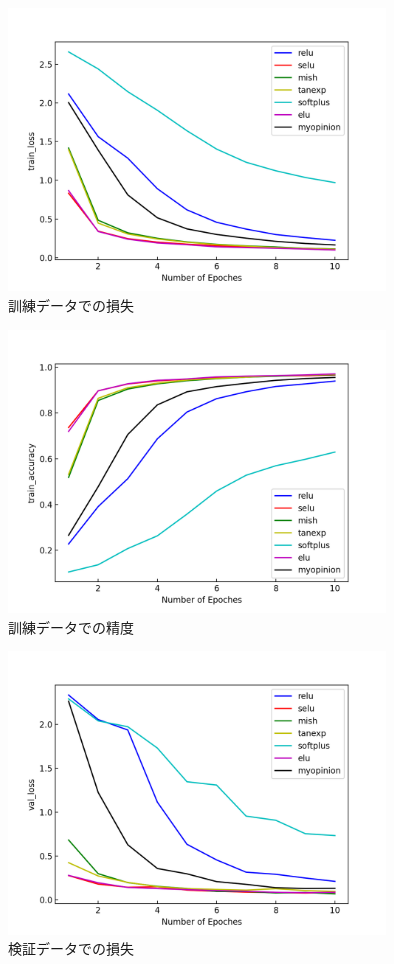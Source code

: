 \documentclass[12pt,a4j,draft]{jsarticle}
\begin{document}
\begin{figure}[H]
  \begin{center}
    \includegraphics[width=10.0cm]{../comparison_data/mnist_train_loss.png}
    \caption{訓練データでの損失}
    \label{train_loss}
  \end{center}
\end{figure}
\begin{figure}[H]
  \begin{center}
    \includegraphics[width=10.0cm]{../comparison_data/mnist_train_acc.png}
    \caption{訓練データでの精度}
    \label{train_acc}
  \end{center}
\end{figure}
\begin{figure}[H]
  \begin{center}
    \includegraphics[width=10.0cm]{../comparison_data/mnist_val_loss.png}
    \caption{検証データでの損失}
    \label{val_loss}
  \end{center}
\end{figure}
\end{document}
